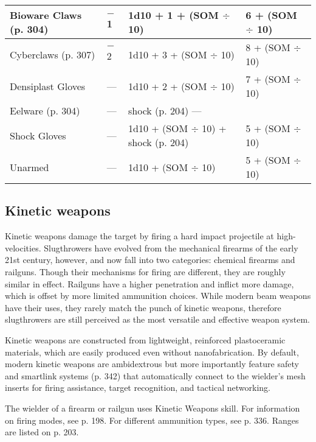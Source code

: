 \begin{table}
\begin{tabularx}{\textwidth}{|l|X|l|l|}
Bioware Claws (p. 304)	&$-$1	&1d10 + 1 + (SOM $\div$ 10)	&6 + (SOM $\div$ 10) \\ \hline

Cyberclaws (p. 307)	&$-$2	&1d10 + 3 + (SOM $\div$ 10)	&8 + (SOM $\div$ 10) \\ \hline

Densiplast Gloves	&--- &1d10 + 2 + (SOM $\div$ 10)	&7 + (SOM $\div$ 10) \\ \hline

Eelware (p. 304)	&--- &shock (p. 204)	--- \\ \hline

Shock Gloves	&--- &1d10 + (SOM $\div$ 10) + shock (p. 204)	&5 + (SOM $\div$ 10) \\ \hline

Unarmed	&--- &1d10 + (SOM $\div$ 10)	&5 + (SOM $\div$ 10) \\ \hline

\end{tabularx} \label{tab:meleeweapons} \end{table} 



\subsection{Kinetic weapons} \label{sec:kinetic-weapons} 

Kinetic weapons damage the target by firing a hard impact projectile at high-velocities. Slugthrowers have evolved from the mechanical firearms of the early 21st century, however, and now fall into two categories: chemical firearms and railguns. Though their mechanisms for firing are different, they are roughly similar in effect. Railguns have a higher penetration and inflict more damage, which is offset by more limited ammunition choices. While modern beam weapons have their uses, they rarely match the punch of kinetic weapons, therefore slugthrowers are still perceived as the most versatile and effective weapon system. 

Kinetic weapons are constructed from lightweight, reinforced plastoceramic materials, which are easily produced even without nanofabrication. By default, modern kinetic weapons are ambidextrous but more importantly feature safety and smartlink systems (p. 342) that automatically connect to the wielder’s mesh inserts for firing assistance, target recognition, and tactical networking. 

The wielder of a firearm or railgun uses Kinetic Weapons skill. For information on firing modes, see p. 198. For different ammunition types, see p. 336. Ranges are listed on p. 203. 


